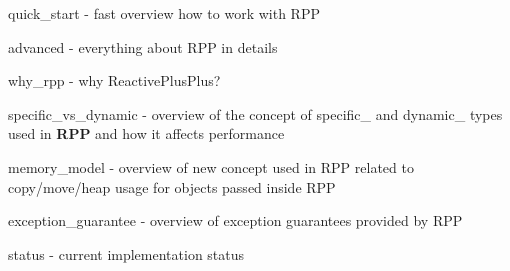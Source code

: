 
\begin{DoxyItemize}
\item quick\+\_\+start -\/ fast overview how to work with RPP
\item advanced -\/ everything about RPP in details
\item why\+\_\+rpp -\/ why Reactive\+Plus\+Plus?
\item specific\+\_\+vs\+\_\+dynamic -\/ overview of the concept of {\ttfamily specific\+\_\+} and {\ttfamily dynamic\+\_\+} types used in {\bfseries{RPP}} and how it affects performance
\item memory\+\_\+model -\/ overview of new concept used in RPP related to copy/move/heap usage for objects passed inside RPP
\item exception\+\_\+guarantee -\/ overview of exception guarantees provided by RPP
\item status -\/ current implementation status 
\end{DoxyItemize}